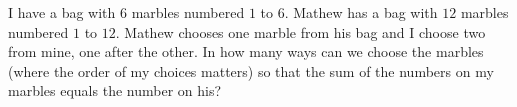 I have a bag with $6$ marbles numbered $1$ to $6$. Mathew has a bag with $12$ marbles numbered $1$ to $12$. Mathew chooses one marble from his bag and I choose two from mine, one after the other. In how many ways can we choose the marbles (where the order of my choices matters) so that the sum of the numbers on my marbles equals the number on his?
